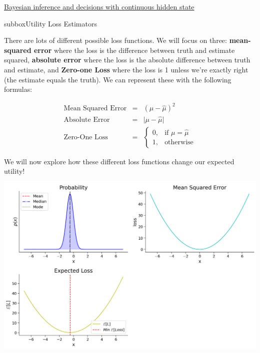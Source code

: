\begin{textbox}{\href{https://compneuro.neuromatch.io/tutorials/W3D1_BayesianDecisions/student/W3D1_Tutorial2.html}{Bayesian inference and decisions with continuous hidden state } }
\begin{subbox}{subbox}{Utility Loss Estimators}
\scriptsize

There are lots of different possible loss functions. We will focus on three: \textbf{mean-squared error} where the loss is the difference between truth and estimate squared, \textbf{absolute error} where the loss is the absolute difference between truth and estimate, and \textbf{Zero-one Loss} where the loss is 1 unless we're exactly right (the estimate equals the truth). We can represent these with the following formulas:

\begin{eqnarray}
\textrm{Mean Squared Error} &=& (\mu - \hat{\mu})^2 \\ 
\textrm{Absolute Error} &=& \big|\mu - \hat{\mu}\big| \\ 
\textrm{Zero-One Loss} &=& \begin{cases}
                            0,& \textrm{if } \mu = \hat{\mu} \\
                            1,              & \textrm{otherwise}
                            \end{cases}
\end{eqnarray}


We will now explore how these different loss functions change our expected utility!

\begin{center}
    
\includegraphics[scale=0.22]{Figures/BD/BD_Figure8.png}
\end{center}


\end{subbox}
\end{textbox}
